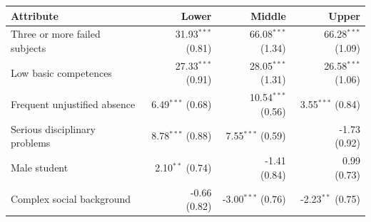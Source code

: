 \begin{tabular}{p{6.1cm}rrr}
\toprule
Attribute & Lower & Middle & Upper \\
\midrule
Three or more failed subjects & \shortstack{31.93$^{***}$\\{\scriptsize (0.81)}} & \shortstack{66.08$^{***}$\\{\scriptsize (1.34)}} & \shortstack{66.28$^{***}$\\{\scriptsize (1.09)}} \\
Low basic competences & \shortstack{27.33$^{***}$\\{\scriptsize (0.91)}} & \shortstack{28.05$^{***}$\\{\scriptsize (1.31)}} & \shortstack{26.58$^{***}$\\{\scriptsize (1.06)}} \\
Frequent unjustified absence & \shortstack{6.49$^{***}$\\{\scriptsize (0.68)}} & \shortstack{10.54$^{***}$\\{\scriptsize (0.56)}} & \shortstack{3.55$^{***}$\\{\scriptsize (0.84)}} \\
Serious disciplinary problems & \shortstack{8.78$^{***}$\\{\scriptsize (0.88)}} & \shortstack{7.55$^{***}$\\{\scriptsize (0.59)}} & \shortstack{-1.73\\{\scriptsize (0.92)}} \\
Male student & \shortstack{2.10$^{**}$\\{\scriptsize (0.74)}} & \shortstack{-1.41\\{\scriptsize (0.84)}} & \shortstack{0.99\\{\scriptsize (0.73)}} \\
Complex social background & \shortstack{-0.66\\{\scriptsize (0.82)}} & \shortstack{-3.00$^{***}$\\{\scriptsize (0.76)}} & \shortstack{-2.23$^{**}$\\{\scriptsize (0.75)}} \\
\bottomrule
\end{tabular}
